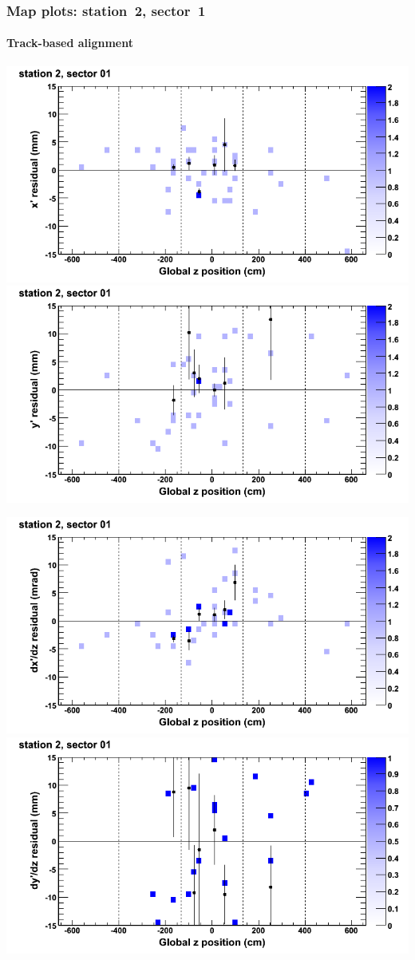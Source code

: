 \documentclass[compress]{beamer}
\begin{document}
\begin{frame}
\frametitle{Map plots: station~2, sector~1}
\framesubtitle{Track-based alignment}
\includegraphics[width=0.5\linewidth]{mapplots_re05/DTvsz_st2sec01_x.png}
\includegraphics[width=0.5\linewidth]{mapplots_re05/DTvsz_st2sec01_y.png}

\includegraphics[width=0.5\linewidth]{mapplots_re05/DTvsz_st2sec01_dxdz.png}
\includegraphics[width=0.5\linewidth]{mapplots_re05/DTvsz_st2sec01_dydz.png}
\end{frame}
\end{document}

